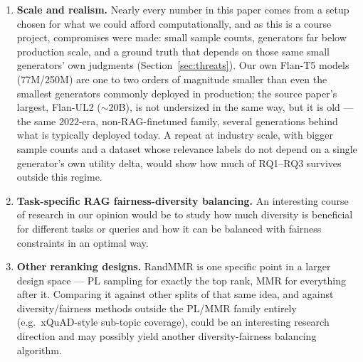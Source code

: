 \documentclass[10pt,twocolumn]{article}
\begin{document}
\begin{enumerate}[leftmargin=1.1em,itemsep=3pt]
  \item \textbf{Scale and realism.} Nearly every number in this paper comes
  from a setup chosen for what we could afford computationally, and as this is a course project, compromises were made:
  small sample counts, generators far below production scale, and a ground
  truth that depends on those same small generators' own judgments
  (Section~\ref{sec:threats}). Our own Flan-T5 models (77M/250M) are one to two
  orders of magnitude smaller than even the smallest generators commonly
  deployed in production; the source paper's largest, Flan-UL2 ($\sim$20B), is
  not undersized in the same way, but it is old --- the same 2022-era,
  non-RAG-finetuned family, several generations behind what is typically
  deployed today. A repeat at industry scale, with bigger sample counts and a
  dataset whose relevance labels do not depend on a single generator's own
  utility delta, would show how much of RQ1--RQ3 survives outside this regime.
  \item \textbf{Task-specific RAG fairness-diversity balancing.} An interesting course of research in our opinion would be to study how much diversity is beneficial for different tasks or queries and how it can be balanced with fairness constraints in an optimal way.
  \item \textbf{Other reranking designs.} RandMMR is one specific point in a
  larger design space --- PL sampling for exactly the top rank, MMR for
  everything after it. Comparing it against other splits of that same idea,
  and against diversity/fairness methods outside the PL/MMR family entirely
  (e.g.\ xQuAD-style sub-topic coverage), could be an interesting research direction and may possibly yield another diversity-fairness balancing algorithm.
\end{enumerate}
\end{document}
